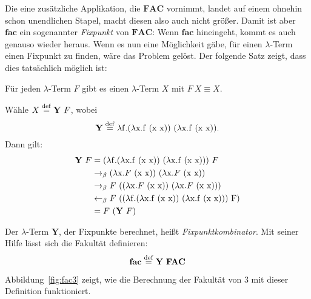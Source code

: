 Die eine zusätzliche Applikation, die $\mathbf{FAC}$ vornimmt, landet
auf einem ohnehin schon unendlichen Stapel,
macht diesen also auch nicht größer.  Damit ist aber $\mathbf{fac}$ ein sogenannter
\textit{Fixpunkt} von $\mathbf{FAC}$:  Wenn $\mathbf{fac}$
hineingeht, kommt es auch genauso wieder heraus.  Wenn es nun eine
Möglichkeit gäbe, für einen $\lambda$-Term einen Fixpunkt zu finden,
wäre das Problem gelöst.  Der folgende Satz zeigt, dass dies tatsächlich
möglich ist:
%
\begin{satz}[Fixpunktsatz]
  \label{satz:fixpunkt}
  Für jeden $\lambda$-Term $F$ gibt es einen $\lambda$-Term $X$ mit
  $F~X\equiv X$.
\end{satz}
\begin{beweis}
  Wähle $X \stackrel{\rm def}{=}{} \mathbf{Y}~F$, wobei
  \begin{displaymath}
    \mathbf{Y} \stackrel{\rm def}{=}{} \lambda \mathrm f.(\lambda \mathrm x.\mathrm f~(\mathrm x~\mathrm x))~(\lambda \mathrm x.\mathrm f~(\mathrm x~\mathrm x)).
  \end{displaymath}
  Dann gilt:
  \begin{displaymath}
    \begin{split}
      \mathbf{Y}~F & = (\lambda \mathrm f.(\lambda \mathrm x.\mathrm f~(\mathrm x~\mathrm x))~(\lambda \mathrm x.\mathrm f~(\mathrm x~\mathrm x)))~F
      \\ & \rightarrow_\beta
      (\lambda \mathrm x.F~(\mathrm x~\mathrm x))~(\lambda \mathrm x.F~(\mathrm x~\mathrm x))
      \\ & \rightarrow_\beta
      F~((\lambda \mathrm x.F~(\mathrm x~\mathrm x))~(\lambda \mathrm x.F~(\mathrm x~\mathrm x)))
      \\ & \leftarrow_\beta
      F~((\lambda \mathrm f.(\lambda \mathrm x.\mathrm f~(\mathrm x~\mathrm x))~(\lambda \mathrm x.\mathrm f~(\mathrm x~\mathrm x)))~\mathrm F)
      \\ & =
      F~(\mathbf{Y}~F)
    \end{split}
  \end{displaymath}
\end{beweis}
%
Der $\lambda$-Term $\mathbf{Y}$, der Fixpunkte
berechnet, heißt
\textit{Fixpunktkombinator}.  Mit seiner Hilfe lässt sich
die Fakultät definieren:
%
\begin{displaymath}
  \mathbf{fac} \stackrel{\rm def}{=}{} \mathbf{Y}~\mathbf{FAC}
\end{displaymath}
%

Abbildung~\ref{fig:fac3} zeigt, wie die Berechnung der Fakultät von
$3$ mit dieser Definition funktioniert.

